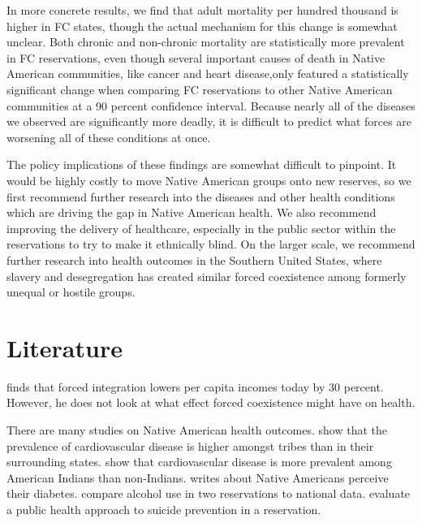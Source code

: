 \documentclass[12pt]{article}
\begin{document}
In more concrete results, we find that adult mortality per hundred thousand is higher in FC states, though the actual mechanism for this change is somewhat unclear.  Both chronic and non-chronic mortality are statistically more prevalent in FC reservations, even though several important causes of death in Native American communities, like cancer and heart disease,only featured a statistically significant change when comparing FC reservations to other Native American communities at a 90 percent confidence interval.  Because nearly all of the diseases we observed are significantly more deadly, it is difficult to predict what forces are worsening all of these conditions at once.

The policy implications of these findings are somewhat difficult to pinpoint.  
It would be highly costly to move Native American groups onto new reserves, so we first recommend further research into the diseases and other health conditions which are driving the gap in Native American health. 
We also recommend improving the delivery of healthcare, especially in the public sector within the reservations to try to make it ethnically blind. 
On the larger scale, we recommend further research into health outcomes in the Southern United States, where slavery and desegregation has created similar forced coexistence among formerly unequal or hostile groups.  


\section{Literature}
\cite{dippel2010forced} finds that forced integration lowers per capita incomes today by 30 percent. However, he does not look at what effect forced coexistence might have on health.

There are many studies on Native American health outcomes. 
\cite{levin2002geographic} show that the prevalence of cardiovascular disease is higher amongst tribes than in their surrounding states.
\cite{harwell2001cardiovascular} show that cardiovascular disease is more prevalent among American Indians than non-Indians.
\cite{patel2013health} writes about Native Americans perceive their diabetes.
\cite{beals2003racial} compare alcohol use in two reservations to national data.
\cite{may2005outcome} evaluate a public health approach to suicide prevention in a reservation.
\end{document}
